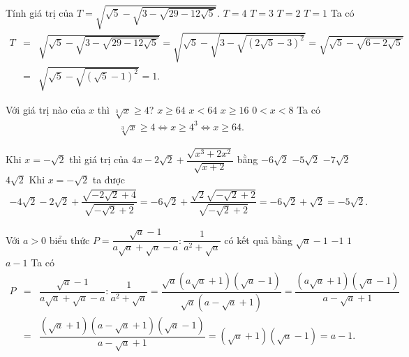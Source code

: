 \begin{bt}
	Tính giá trị của $T=\sqrt{\sqrt{5}-\sqrt{3-\sqrt{29-12\sqrt{5}}}}$.
	\choice
	{$T=4$}
	{$T=3$}
	{$T=2$}
	{\True $T=1$}
	\loigiai
	{
		Ta có
		\allowdisplaybreaks
		\begin{eqnarray*}
			T&=&\sqrt{\sqrt{5}-\sqrt{3-\sqrt{29-12\sqrt{5}}}} = \sqrt{\sqrt{5}-\sqrt{3-\sqrt{\left(2\sqrt{5}-3\right)^2}}} = \sqrt{\sqrt{5}-\sqrt{6-2\sqrt{5}}}\\
			&=&\sqrt{\sqrt{5}-\sqrt{\left(\sqrt{5}-1\right)^2}}=1.
		\end{eqnarray*}
	}
\end{bt}

\begin{bt}
	Với giá trị nào của $x$ thì $\sqrt[3]{x}\geq 4$?
	\choice
	{\True $x\geq 64$}
	{$x<64$}
	{$x\geq 16$}
	{$0<x<8$}
	\loigiai
	{
		Ta có
		\allowdisplaybreaks
		\begin{eqnarray*}
			\sqrt[3]{x} \geq 4 \Leftrightarrow x \geq 4^3 \Leftrightarrow x \geq 64.
		\end{eqnarray*}
	}
\end{bt}

\begin{bt}
	Khi $x=-\sqrt{2}$ thì giá trị của $4x-2\sqrt{2}+\dfrac{\sqrt{x^3+2x^2}}{\sqrt{x+2}}$ bằng
	\choice
	{$-6\sqrt{2}$}
	{\True $-5\sqrt{2}$}
	{$-7\sqrt{2}$}
	{$4\sqrt{2}$}
	\loigiai
	{
		Khi $x=-\sqrt{2}$ ta được
		\allowdisplaybreaks
		\begin{eqnarray*}
			-4\sqrt{2}-2\sqrt{2}+\dfrac{\sqrt{-2\sqrt{2}+4}}{\sqrt{-\sqrt{2}+2}}=-6\sqrt{2}+\dfrac{\sqrt{2}\sqrt{-\sqrt{2}+2}}{\sqrt{-\sqrt{2}+2}}=-6\sqrt{2}+\sqrt{2}=-5\sqrt{2}.
		\end{eqnarray*}
	}
\end{bt}

\begin{bt}
	Với $a>0$ biểu thức $P=\dfrac{\sqrt{a}-1}{a\sqrt{a}+\sqrt{a}-a}:\dfrac{1}{a^2+\sqrt{a}}$ có kết quả bằng
	\choice
	{$\sqrt{a}-1$}
	{$-1$}
	{$1$}
	{\True $a-1$}
	\loigiai
	{
		Ta có
		\allowdisplaybreaks
		\begin{eqnarray*}
			P&=&\dfrac{\sqrt{a}-1}{a\sqrt{a}+\sqrt{a}-a}:\dfrac{1}{a^2+\sqrt{a}}=\dfrac{\sqrt{a}\left(a\sqrt{a}+1\right)\left(\sqrt{a}-1\right)}{\sqrt{a}\left(a-\sqrt{a}+1\right)} = \dfrac{\left(a\sqrt{a}+1\right)\left(\sqrt{a}-1\right)}{a-\sqrt{a}+1}\\
			&=& \dfrac{\left(\sqrt{a}+1\right)\left(a-\sqrt{a}+1\right)\left(\sqrt{a}-1\right)}{a-\sqrt{a}+1} = \left(\sqrt{a}+1\right)\left(\sqrt{a}-1\right) = a-1.
		\end{eqnarray*}
	}
\end{bt}

